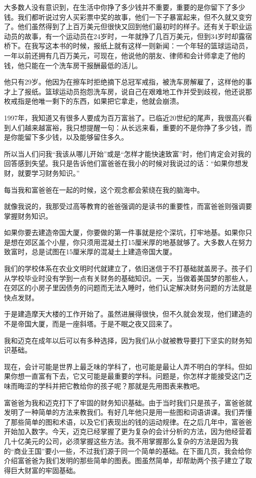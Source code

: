大多数人没有意识到，在生活中你挣了多少钱并不重要，重要的是你留下了多少钱。我们都听说过穷人买彩票中奖的故事，他们一下子暴富起来，但不久就又变穷了。他们虽然得到了上百万美元但很快又回到他们最初时的样子。还有关于职业运动员的故事，有一个运动员在24岁时，一年就挣了几百万美元，但到34岁时却露宿桥下。在我写这本书的时候，报纸上就有这样一则新闻：一个年轻的篮球运动员，一年以前还拥有几百万美元，可现在，他说他的朋友、律师和会计师拿走了他的钱，他只能在一个洗车房干报酬最低的活儿。

他只有29岁。他因为在擦车时拒绝摘下总冠军戒指，被洗车房解雇了，这样他的事才上了报纸。篮球运动员抱怨洗车房，说自己在艰难地工作并受到歧视，他还说那枚戒指是他唯一剩下的东西，如果把它拿走，他就会崩溃。

1997年，我知道又有很多人要成为百万富翁了。已临近20世纪的尾声，我很高兴看到人们越来越富裕，我只想提醒一句：从长远来看，重要的不是你挣了多少钱，而是你能留下多少钱，以及能够留住多久。

所以当人们问我“我该从哪儿开始”或是“怎样才能快速致富”时，他们肯定会对我的回答感到失望。我只是告诉他们富爸爸在我小的时候对我说过的话：“如果你想发财，就要学习财务知识。”

每当我和富爸爸在一起的时候，这个观念都会萦绕在我的脑海中。

就像我说的，我那受过高等教育的爸爸强调的是读书的重要性，而富爸爸则强调要掌握财务知识。

如果你要去建造帝国大厦，你要做的第一件事就是挖个深坑，打牢地基。如果你只是想在郊区盖个小屋，你只须用混凝土打15厘米厚的地基就够了。大多数人在努力致富时，总是试图在15厘米厚的混凝土上建造帝国大厦。

我们的学校体系在农业文明时代就建立了，依旧迷信于不打基础就盖房子。孩子们从学校毕业时没有学到一点有关财务的基础知识。一天，当做着美国梦的那些人，在郊区的小房子里因债务的问题而无法入睡时，他们认定解决财务问题的方法就是快点发财。

于是建造摩天大楼的工作开始了。虽然进展得很快，但不久就会发现，他们建造的不是帝国大厦，而是一座斜塔。于是不眠之夜又回来了。

我和迈克在成年以后可以有多种选择，因为我们从小就被教导要打下坚实的财务知识基础。

现在，会计可能是世界上最乏味的学科了，也可能是最让人弄不明白的学科。但如果你想一直富有下去，它又可能是最重要的学科。问题是，你怎样才能接受这门乏味而晦涩的学科并把它教给你的孩子呢？那就是先用图表来教吧。

富爸爸为我和迈克打下了牢固的财务知识基础。由于当时我们只是孩子，富爸爸就发明了一种简单的方法来教我们。有好几年他只是用一些图和词语讲课。我们弄懂了那些简单的图和术语，以及它们表现出的钱的运动规律。在之后几年中，富爸爸开始加入数字。今天，迈克已经掌握了更为复杂的会计分析的方法，因为他经营着几十亿美元的公司，必须掌握这些方法。我不用掌握那么复杂的方法是因为我的“商业王国”要小一些，不过我们源于同一个简单的基础。在下面几页，我会给你介绍富爸爸为我们发明的那些简单的图表。图虽然简单，却帮助两个孩子建立了取得巨大财富的牢固基础。

